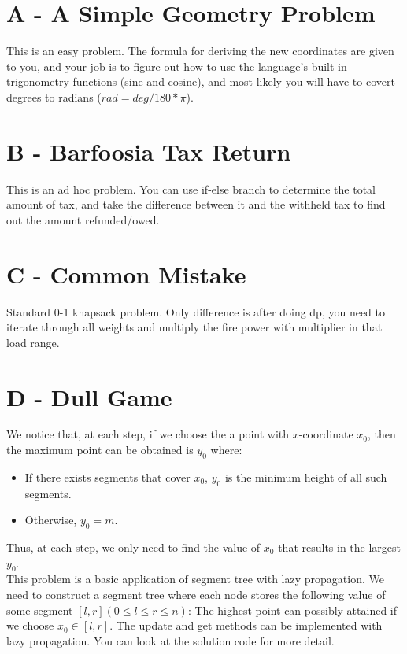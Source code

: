 \documentclass{article}
\begin{document}
\section*{A - A Simple Geometry Problem}

This is an easy problem. The formula for deriving the new coordinates are given to you, and your job is to figure out how to use the language's built-in trigonometry functions (sine and cosine), and most likely you will have to covert degrees to radians ($rad = deg / 180 * \pi$). 

\section*{B - Barfoosia Tax Return}

This is an ad hoc problem. You can use if-else branch to determine the total amount of tax, and take the difference between it and the withheld tax to find out the amount refunded/owed. 

\section*{C - Common Mistake}
Standard 0-1 knapsack problem. Only difference is after doing dp, you need to iterate through all weights and multiply the fire power with multiplier in that load range.

\section*{D - Dull Game}
We notice that, at each step, if we choose the a point with $x$-coordinate $x_0$, then the maximum
point can be obtained is $y_0$ where:
\begin{itemize}
\item
If there exists segments that cover $x_0$, $y_0$ is the minimum height of all such segments.
\item
Otherwise, $y_0 = m$.
\end{itemize}
Thus, at each step, we only need to find the value of $x_0$ that results in the largest $y_0$.\\

\noindent This problem is a basic application of segment tree with lazy propagation. We need to construct a
segment tree where each node stores the following value of some segment $[l, r] (0 \leq l \leq r \leq n)$:
The highest point can possibly attained if we choose $x_0 \in [l, r]$. The update and get methods can be
implemented with lazy propagation. You can look at the solution code for more detail.\\
\end{document}

